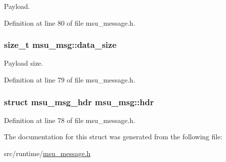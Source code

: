 Payload. 



Definition at line 80 of file msu\-\_\-message.\-h.

\hypertarget{structmsu__msg_ad6dbac0bebca6dacb6cc2b1157d114ba}{
\subsubsection[{data\-\_\-size}]{\setlength{\rightskip}{0pt plus 5cm}size\-\_\-t msu\-\_\-msg\-::data\-\_\-size}}\label{structmsu__msg_ad6dbac0bebca6dacb6cc2b1157d114ba}


Payload size. 



Definition at line 79 of file msu\-\_\-message.\-h.

\hypertarget{structmsu__msg_a3c0177321a542571240821c2350ba424}{
\subsubsection[{hdr}]{\setlength{\rightskip}{0pt plus 5cm}struct {\bf msu\-\_\-msg\-\_\-hdr} msu\-\_\-msg\-::hdr}}\label{structmsu__msg_a3c0177321a542571240821c2350ba424}


Definition at line 78 of file msu\-\_\-message.\-h.



The documentation for this struct was generated from the following file\-:\begin{DoxyCompactItemize}
\item 
src/runtime/\hyperlink{msu__message_8h}{msu\-\_\-message.\-h}\end{DoxyCompactItemize}

